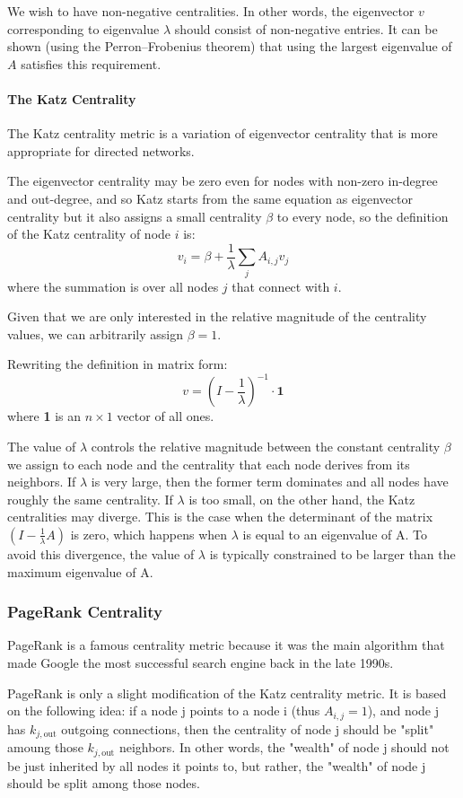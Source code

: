 \documentclass[11pt]{scrartcl} %
\begin{document}
We wish to have non-negative centralities. In other words, the eigenvector $v$ corresponding to eigenvalue $\lambda$ should consist of non-negative entries. It can be shown (using the Perron–Frobenius theorem) that using the largest eigenvalue of $A$ satisfies this requirement.

\paragraph{The Katz Centrality}
The Katz centrality metric is a variation of eigenvector centrality that is more appropriate for directed networks.

The eigenvector centrality may be zero even for nodes with non-zero in-degree and out-degree,  and so Katz starts from the same equation as eigenvector centrality but it also assigns a small centrality $\beta$ to every node, so the definition of the Katz centrality of node $i$ is:
\[ v_i = \beta + \frac{1}{\lambda} \sum_{j} A_{i,j} v_j \]
where the summation is over all nodes $j$ that connect with $i$.

Given that we are only interested in the relative magnitude of the centrality values, we can arbitrarily assign $\beta = 1$.

Rewriting the definition in matrix form:
\[ v = (I - \frac{1}{\lambda})^{-1} \cdot \textbf{1} \]
where \textbf{1} is an $n \times 1$ vector of all ones.

The value of $\lambda$ controls the relative magnitude between the constant centrality $\beta$ we assign to each node and the centrality that each node derives from its neighbors. If $\lambda$ is very large, then the former term dominates and all nodes have roughly the same centrality. If $\lambda$ is too small, on the other hand, the Katz centralities may diverge. This is the case when the determinant of the matrix $(I - \frac{1}{\lambda} A)$ is zero, which happens when $\lambda$ is equal to an eigenvalue of A. To avoid this divergence, the value of $\lambda$ is typically constrained to be larger than the maximum eigenvalue of A.

\subsubsection{PageRank Centrality}
PageRank is a famous centrality metric because it was the main algorithm that made Google the most successful search engine back in the late 1990s.

PageRank is only a slight modification of the Katz centrality metric. It is based on the following idea: if a node j points to a node i (thus $A_{i,j}=1$), and node j has $k_{j, \text{out}}$ outgoing connections, then the centrality of node j should be "split" amoung those $k_{j, \text{out}}$ neighbors. In other words, the "wealth" of node j should not be just inherited by all nodes it points to, but rather, the "wealth" of node j should be split among those nodes.
\end{document}
